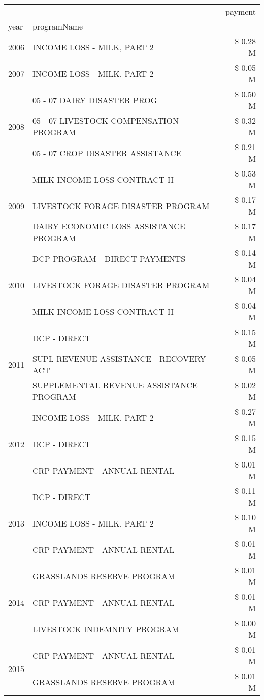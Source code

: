 \begin{tabular}{llr}
\toprule
 &  & payment \\
year & programName &  \\
\midrule
2006 & INCOME LOSS - MILK, PART 2 & \$ 0.28 M \\
\cline{1-3}
2007 & INCOME LOSS - MILK, PART 2 & \$ 0.05 M \\
\cline{1-3}
\multirow[t]{3}{*}{2008} & 05 - 07 DAIRY DISASTER PROG & \$ 0.50 M \\
 & 05 - 07 LIVESTOCK COMPENSATION PROGRAM & \$ 0.32 M \\
 & 05 - 07 CROP DISASTER ASSISTANCE & \$ 0.21 M \\
\cline{1-3}
\multirow[t]{3}{*}{2009} & MILK INCOME LOSS CONTRACT II & \$ 0.53 M \\
 & LIVESTOCK FORAGE DISASTER  PROGRAM & \$ 0.17 M \\
 & DAIRY ECONOMIC LOSS ASSISTANCE PROGRAM & \$ 0.17 M \\
\cline{1-3}
\multirow[t]{3}{*}{2010} & DCP PROGRAM - DIRECT PAYMENTS & \$ 0.14 M \\
 & LIVESTOCK FORAGE DISASTER  PROGRAM & \$ 0.04 M \\
 & MILK INCOME LOSS CONTRACT II & \$ 0.04 M \\
\cline{1-3}
\multirow[t]{3}{*}{2011} & DCP - DIRECT & \$ 0.15 M \\
 & SUPL REVENUE ASSISTANCE - RECOVERY ACT & \$ 0.05 M \\
 & SUPPLEMENTAL REVENUE ASSISTANCE PROGRAM & \$ 0.02 M \\
\cline{1-3}
\multirow[t]{3}{*}{2012} & INCOME LOSS - MILK, PART 2 & \$ 0.27 M \\
 & DCP - DIRECT & \$ 0.15 M \\
 & CRP PAYMENT - ANNUAL RENTAL & \$ 0.01 M \\
\cline{1-3}
\multirow[t]{3}{*}{2013} & DCP - DIRECT & \$ 0.11 M \\
 & INCOME LOSS - MILK, PART 2 & \$ 0.10 M \\
 & CRP PAYMENT - ANNUAL RENTAL & \$ 0.01 M \\
\cline{1-3}
\multirow[t]{3}{*}{2014} & GRASSLANDS RESERVE PROGRAM & \$ 0.01 M \\
 & CRP PAYMENT - ANNUAL RENTAL & \$ 0.01 M \\
 & LIVESTOCK INDEMNITY PROGRAM & \$ 0.00 M \\
\cline{1-3}
\multirow[t]{3}{*}{2015} & CRP PAYMENT - ANNUAL RENTAL & \$ 0.01 M \\
 & GRASSLANDS RESERVE PROGRAM & \$ 0.01 M \\

\end{tabular}

